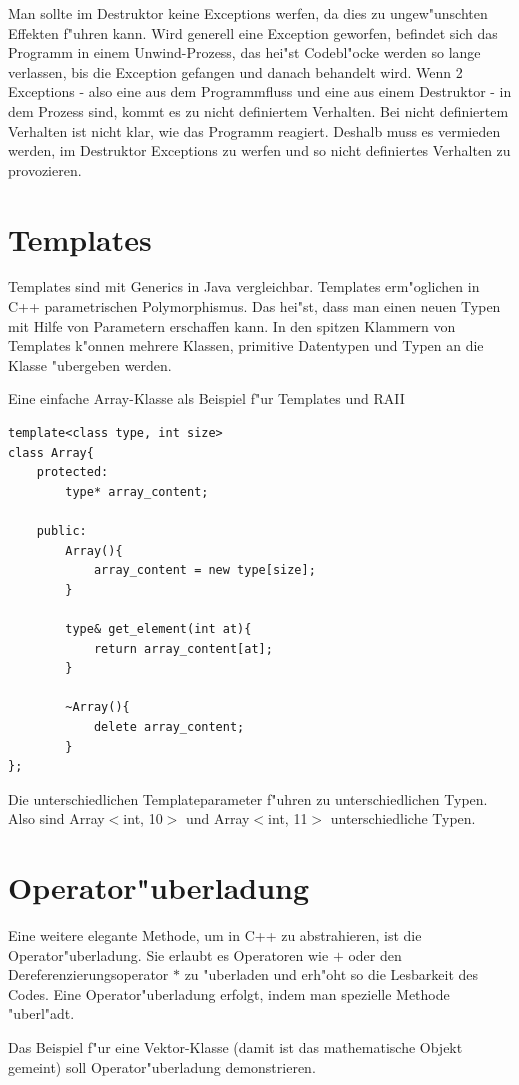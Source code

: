 \documentclass[14pt, a4paper]{report}
\begin{document}
Man sollte im Destruktor keine Exceptions werfen, da dies zu ungew"unschten Effekten 
f"uhren kann. Wird generell eine Exception geworfen, befindet sich das Programm in einem
Unwind-Prozess, das hei"st Codebl"ocke werden so lange verlassen, bis die Exception
gefangen und danach behandelt wird. Wenn 2 Exceptions - also eine aus
dem Programmfluss und eine aus einem Destruktor - in dem Prozess sind, kommt es zu nicht
definiertem Verhalten. Bei nicht definiertem Verhalten ist nicht klar, wie das Programm 
reagiert. Deshalb muss es vermieden werden, im Destruktor Exceptions zu werfen und so
nicht definiertes Verhalten zu provozieren.
\newpage
\section{Templates}
Templates sind mit Generics in Java vergleichbar. Templates erm"oglichen in C++
parametrischen Polymorphismus. Das hei"st, dass man einen neuen Typen mit Hilfe von 
Parametern erschaffen kann. In den spitzen Klammern von Templates k"onnen mehrere 
Klassen, primitive Datentypen und Typen an die Klasse "ubergeben werden.

Eine einfache Array-Klasse als Beispiel f"ur Templates und RAII
\begin{lstlisting}
template<class type, int size>
class Array{
	protected:
		type* array_content;

	public:
		Array(){
			array_content = new type[size];
		}

		type& get_element(int at){
			return array_content[at];
		}

		~Array(){
			delete array_content;
		}
}; 
\end{lstlisting}

Die unterschiedlichen Templateparameter f"uhren zu unterschiedlichen Typen. Also sind 
Array$<$int, 10$>$ und Array$<$int, 11$>$ unterschiedliche Typen.

\newpage
\section{Operator"uberladung}
Eine weitere elegante Methode, um in C++ zu abstrahieren, ist die Operator"uberladung.
Sie erlaubt es Operatoren wie $+$ oder den Dereferenzierungsoperator $*$ zu "uberladen
und erh"oht so die Lesbarkeit des Codes. Eine Operator"uberladung erfolgt, indem man
spezielle Methode "uberl"adt.

Das Beispiel f"ur eine Vektor-Klasse (damit ist das mathematische Objekt gemeint) soll
Operator"uberladung demonstrieren.
\end{document}
